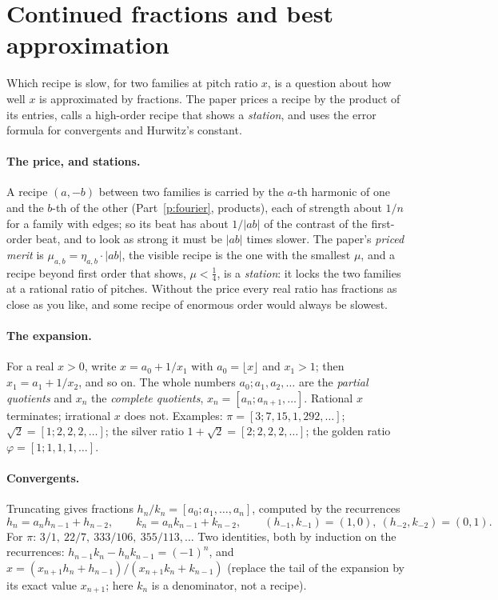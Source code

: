 \documentclass[10pt]{article}
\theoremstyle{plain}
\theoremstyle{definition}
\newcommand{\het}{\eta}
\begin{document}
\section{Continued fractions and best approximation}
\label{p:cf}

\begin{why}
Which recipe is slow, for two families at pitch ratio $x$, is a question
about how well $x$ is approximated by fractions. The paper prices a recipe
by the product of its entries, calls a high-order recipe that shows a
\emph{station}, and uses the error formula for convergents and Hurwitz's
constant.
\end{why}

\paragraph{The price, and stations.}
A recipe $(a,-b)$ between two families is carried by the $a$-th harmonic of
one and the $b$-th of the other (Part~\ref{p:fourier}, products), each of
strength about $1/n$ for a family with edges; so its beat has about
$1/|ab|$ of the contrast of the first-order beat, and to look as strong it
must be $|ab|$ times slower. The paper's \emph{priced merit} is
$\mu_{a,b}=\het_{a,b}\cdot|ab|$, the visible recipe is the one with the
smallest $\mu$, and a recipe beyond first order that shows, $\mu<\tfrac14$,
is a \emph{station}: it locks the two families at a rational ratio of
pitches. Without the price every real ratio has fractions as close as you
like, and some recipe of enormous order would always be slowest.

\paragraph{The expansion.}
For a real $x>0$, write $x=a_0+1/x_1$ with $a_0=\lfloor x\rfloor$ and
$x_1>1$; then $x_1=a_1+1/x_2$, and so on. The whole numbers $a_0;a_1,a_2,\dots$
are the \emph{partial quotients} and $x_n$ the \emph{complete quotients},
$x_n=[a_n;a_{n+1},\dots]$. Rational $x$ terminates; irrational $x$ does not.
Examples: $\pi=[3;7,15,1,292,\dots]$; $\sqrt2=[1;2,2,2,\dots]$; the silver
ratio $1+\sqrt2=[2;2,2,2,\dots]$; the golden ratio
$\varphi=[1;1,1,1,\dots]$.

\paragraph{Convergents.}
Truncating gives fractions $h_n/k_n=[a_0;a_1,\dots,a_n]$, computed by the
recurrences
\[
  h_n=a_nh_{n-1}+h_{n-2},\qquad k_n=a_nk_{n-1}+k_{n-2},\qquad
  (h_{-1},k_{-1})=(1,0),\ (h_{-2},k_{-2})=(0,1).
\]
For $\pi$: $3/1,\ 22/7,\ 333/106,\ 355/113,\dots$ Two identities, both by
induction on the recurrences: $h_{n-1}k_n-h_nk_{n-1}=(-1)^n$, and
$x=(x_{n+1}h_n+h_{n-1})/(x_{n+1}k_n+k_{n-1})$ (replace the tail of the
expansion by its exact value $x_{n+1}$; here $k_n$ is a denominator, not a
recipe).
\end{document}
